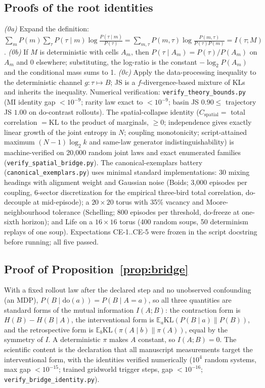 \documentclass[11pt]{article}
\theoremstyle{definition}
\newcommand{\dO}[1]{\mathrm{do}(#1)}
\newcommand{\KL}{\mathrm{KL}}
\begin{document}
\subsection*{Proofs of the root identities}
\emph{(0a)} Expand the definition:
$\sum_m P(m) \sum_\tau P(\tau \mid m) \log \frac{P(\tau \mid m)}{P(\tau)}
= \sum_{m,\tau} P(m,\tau) \log \frac{P(m,\tau)}{P(\tau)P(m)} = I(\tau; M)$.
\emph{(0b)} If $M$ is deterministic with cells $A_m$, then
$P(\tau \mid A_m) = P(\tau)/P(A_m)$ on $A_m$ and $0$ elsewhere;
substituting, the log-ratio is the constant $-\log_2 P(A_m)$ and the
conditional mass sums to 1.
\emph{(0c)} Apply the data-processing inequality to the deterministic
channel $g: \tau \mapsto B$; JS is a $f$-divergence-based mixture of
KLs and inherits the inequality.
Numerical verification: \texttt{verify\_theory\_bounds.py}
(MI identity gap $<10^{-9}$; rarity law exact to $<10^{-9}$;
basin JS $0.90 \le$ trajectory JS $1.00$ on do-contrast rollouts).
The spatial-collapse identity ($C_{\mathrm{spatial}} =$ total
correlation $= \mathrm{KL}$ to the product of marginals, $\ge 0$;
independence gives exactly linear growth of the joint entropy in $N$;
coupling monotonicity; script-attained maximum $(N{-}1)\log_2 k$ and
same-law generator indistinguishability) is machine-verified on
20{,}000 random joint laws and exact enumerated families
(\texttt{verify\_spatial\_bridge.py}). The canonical-exemplars battery
(\texttt{canonical\_exemplars.py}) uses minimal standard
implementations: 30 mixing headings with alignment weight and
Gaussian noise (Boids; 3,000 episodes per coupling, 6-sector
discretization for the empirical three-bird total correlation,
do-decouple at mid-episode); a $20{\times}20$ torus with 35\% vacancy
and Moore-neighbourhood tolerance (Schelling; 800 episodes per
threshold, do-freeze at one-sixth horizon); and Life on a
$16{\times}16$ torus (400 random soups, 50 determinism replays of one
soup). Expectations CE-1..CE-5 were frozen in the script docstring
before running; all five passed.

\subsection*{Proof of Proposition~\ref{prop:bridge}}
With a fixed rollout law after the declared step and no unobserved
confounding (an MDP), $P(B \mid \dO{a}) = P(B \mid A{=}a)$, so all
three quantities are standard forms of the mutual information
$I(A;B)$: the contraction form is $H(B)-H(B\mid A)$, the
interventional form is $\mathbb{E}_a \KL(P(B\mid a)\|P(B))$, and the
retrospective form is $\mathbb{E}_b \KL(\pi(A\mid b)\|\pi(A))$, equal
by the symmetry of $I$. A deterministic $\pi$ makes $A$ constant, so
$I(A;B)=0$. The scientific content is the declaration that all
manuscript measurements target the interventional form, with the
identities verified numerically ($10^4$ random systems, max gap
$<10^{-15}$; trained gridworld trigger steps, gap $<10^{-16}$;
\texttt{verify\_bridge\_identity.py}).
\end{document}
